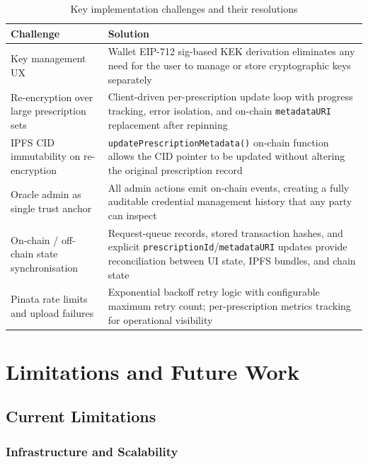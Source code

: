 \documentclass[12pt,a4wide]{report}
\begin{document}
\begin{table}[H]
\centering
\caption{Key implementation challenges and their resolutions}
\label{tab:challenges}
\begin{tabular}{@{}p{5.3cm}p{7.7cm}@{}}
\toprule
\textbf{Challenge} & \textbf{Solution} \\
\midrule
Key management UX & Wallet EIP-712 sig-based KEK derivation eliminates any need for the user to manage or store cryptographic keys separately \\[4pt]
Re-encryption over large prescription sets & Client-driven per-prescription update loop with progress tracking, error isolation, and on-chain \texttt{metadataURI} replacement after repinning \\[4pt]
IPFS CID immutability on re-encryption & \texttt{updatePrescriptionMetadata()} on-chain function allows the CID pointer to be updated without altering the original prescription record \\[4pt]
Oracle admin as single trust anchor & All admin actions emit on-chain events, creating a fully auditable credential management history that any party can inspect \\[4pt]
On-chain / off-chain state synchronisation & Request-queue records, stored transaction hashes, and explicit \texttt{prescriptionId}/\texttt{metadataURI} updates provide reconciliation between UI state, IPFS bundles, and chain state \\[4pt]
Pinata rate limits and upload failures & Exponential backoff retry logic with configurable maximum retry count; per-prescription metrics tracking for operational visibility \\
\bottomrule
\end{tabular}
\end{table}

\chapter{Limitations and Future Work}

\section{Current Limitations}

\subsection{Infrastructure and Scalability}
\end{document}
